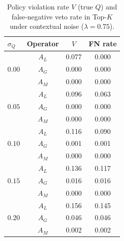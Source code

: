 \begin{table}[H]
\caption{Policy violation rate $V$ (true $Q$) and false-negative veto rate in Top-$K$ under contextual noise ($\lambda=0.75$).}
\label{tab:contextual-noise}
\centering
\small
\renewcommand{\arraystretch}{1.2}
\begin{tabular}{lccc}
\toprule
$\sigma_Q$ & Operator & $V$ & FN rate \\
\midrule
\multirow{3}{*}{$0.00$} & $A_L$ & 0.077 & 0.000 \\
 & $A_G$ & 0.000 & 0.000 \\
 & $A_M$ & 0.000 & 0.000 \\
\midrule
\multirow{3}{*}{$0.05$} & $A_L$ & 0.096 & 0.063 \\
 & $A_G$ & 0.000 & 0.000 \\
 & $A_M$ & 0.000 & 0.000 \\
\midrule
\multirow{3}{*}{$0.10$} & $A_L$ & 0.116 & 0.090 \\
 & $A_G$ & 0.001 & 0.001 \\
 & $A_M$ & 0.000 & 0.000 \\
\midrule
\multirow{3}{*}{$0.15$} & $A_L$ & 0.136 & 0.117 \\
 & $A_G$ & 0.016 & 0.016 \\
 & $A_M$ & 0.000 & 0.000 \\
\midrule
\multirow{3}{*}{$0.20$} & $A_L$ & 0.156 & 0.145 \\
 & $A_G$ & 0.046 & 0.046 \\
 & $A_M$ & 0.002 & 0.002 \\
\bottomrule
\end{tabular}
\end{table}

